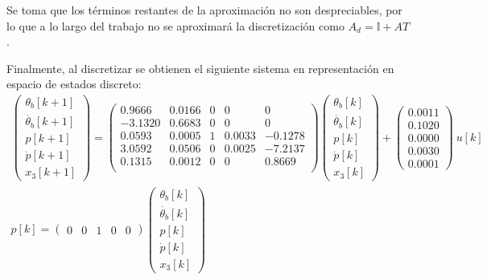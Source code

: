 \documentclass[a4paper,10pt]{article}
\begin{document}
Se toma que los términos restantes de la aproximación no son despreciables, por lo que a lo largo del trabajo no se aproximará la discretización como $A_d = \mathbb{I} + A T$. 

Finalmente, al discretizar se obtienen el siguiente sistema en representación en espacio de estados discreto:
\begin{gather*}
    \begin{pmatrix} 
        \theta_b[k+1] \\ \dot{\theta_b}[k+1]  \\ p[k+1]  \\ \dot{p}[k+1]  \\ x_3[k+1]   
    \end{pmatrix} = 
    \begin{pmatrix}
        0.9666 & 0.0166 & 0 &      0 &       0 \\
       -3.1320 & 0.6683 & 0 &      0 &       0 \\
        0.0593 & 0.0005 & 1 & 0.0033 & -0.1278 \\
        3.0592 & 0.0506 & 0 & 0.0025 & -7.2137 \\
        0.1315 & 0.0012 & 0 &      0 &  0.8669 \\
    \end{pmatrix} 
    \begin{pmatrix} 
        \theta_b[k] \\ \dot{\theta_b}[k] \\ p[k] \\ \dot{p}[k] \\ x_3[k]
    \end{pmatrix} +
    \begin{pmatrix} 0.0011 \\ 0.1020 \\ 0.0000 \\ 0.0030 \\ 0.0001 \end{pmatrix} ~ u[k] \\
    p[k] = \begin{pmatrix} 0 & 0 & 1 & 0 & 0 \end{pmatrix}
    \begin{pmatrix} 
        \theta_b[k] \\ \dot{\theta_b}[k] \\ p[k] \\ \dot{p}[k] \\ x_3[k]
    \end{pmatrix}
\end{gather*}
\end{document}
